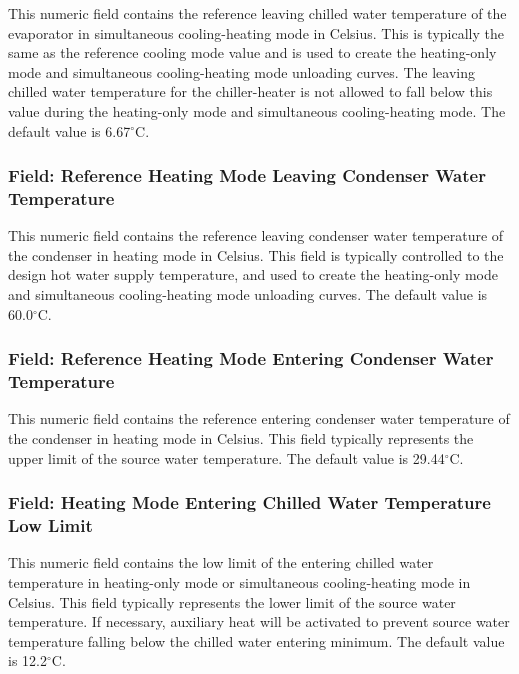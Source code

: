 This numeric field contains the reference leaving chilled water temperature of the evaporator in simultaneous cooling-heating mode in Celsius. This is typically the same as the reference cooling mode value and is used to create the heating-only mode and simultaneous cooling-heating mode unloading curves. The leaving chilled water temperature for the chiller-heater is not allowed to fall below this value during the heating-only mode and simultaneous cooling-heating mode. The default value is 6.67$^\circ$C.

\subsubsection{Field: Reference Heating Mode Leaving Condenser Water Temperature}\label{field-reference-heating-mode-leaving-condenser-water-temperature}

This numeric field contains the reference leaving condenser water temperature of the condenser in heating mode in Celsius. This field is typically controlled to the design hot water supply temperature, and used to create the heating-only mode and simultaneous cooling-heating mode unloading curves. The default value is 60.0$^\circ$C.

\subsubsection{Field: Reference Heating Mode Entering Condenser Water Temperature}\label{field-reference-heating-mode-entering-condenser-water-temperature}

This numeric field contains the reference entering condenser water temperature of the condenser in heating mode in Celsius. This field typically represents the upper limit of the source water temperature. The default value is 29.44$^\circ$C.

\subsubsection{Field: Heating Mode Entering Chilled Water Temperature Low Limit}\label{field-heating-mode-entering-chilled-water-temperature-low-limit}

This numeric field contains the low limit of the entering chilled water temperature in heating-only mode or simultaneous cooling-heating mode in Celsius. This field typically represents the lower limit of the source water temperature. If necessary, auxiliary heat will be activated to prevent source water temperature falling below the chilled water entering minimum. The default value is 12.2$^\circ$C.

